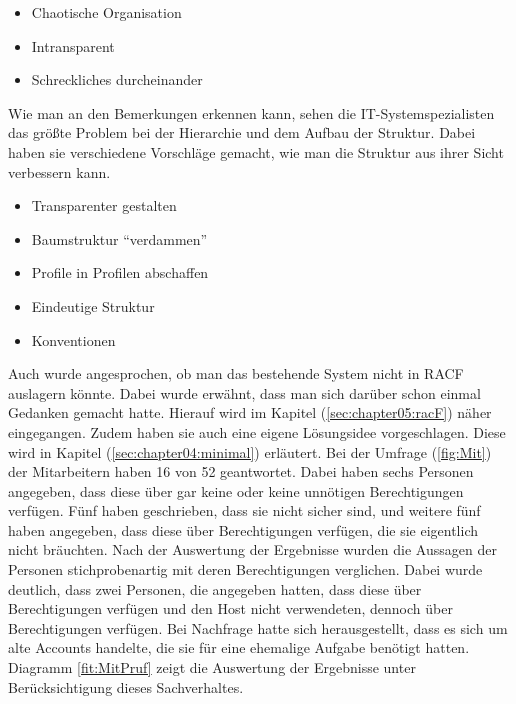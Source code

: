 \begin{itemize}
	\item Chaotische Organisation
	\item Intransparent
	\item Schreckliches durcheinander
\end{itemize}

Wie man an den Bemerkungen erkennen kann, sehen die IT-Systemspezialisten das größte Problem bei der Hierarchie und dem Aufbau der Struktur.
Dabei haben sie verschiedene Vorschläge gemacht, wie man die Struktur aus ihrer Sicht verbessern kann.

\begin{itemize}
	\item Transparenter gestalten
	\item Baumstruktur "`verdammen"'
	\item Profile in Profilen abschaffen
	\item Eindeutige Struktur
	\item Konventionen
\end{itemize}
Auch wurde angesprochen, ob man das bestehende System nicht in RACF auslagern könnte.
Dabei wurde erwähnt, dass man sich darüber schon einmal Gedanken gemacht hatte.
Hierauf wird im Kapitel (\ref{sec:chapter05:racF}) näher eingegangen.
Zudem haben sie auch eine eigene Lösungsidee vorgeschlagen.
Diese wird in Kapitel (\ref{sec:chapter04:minimal}) erläutert.
\newline
\newline
Bei der Umfrage (\ref{fig:Mit}) der Mitarbeitern haben 16 von 52 geantwortet.
Dabei haben sechs Personen angegeben, dass diese über gar keine oder keine unnötigen Berechtigungen verfügen.
Fünf haben geschrieben, dass sie nicht sicher sind, und weitere fünf haben angegeben, dass diese über Berechtigungen verfügen, die sie eigentlich nicht bräuchten.
Nach der Auswertung der Ergebnisse wurden die Aussagen der Personen stichprobenartig mit deren Berechtigungen verglichen.
Dabei wurde deutlich, dass zwei Personen, die angegeben hatten, dass diese über Berechtigungen verfügen und den Host nicht verwendeten, dennoch über Berechtigungen verfügen.
Bei Nachfrage hatte sich herausgestellt, dass es sich um alte Accounts handelte, die sie für eine ehemalige Aufgabe benötigt hatten.
Diagramm \ref{fit:MitPruf} zeigt die Auswertung der Ergebnisse unter Berücksichtigung dieses Sachverhaltes.
